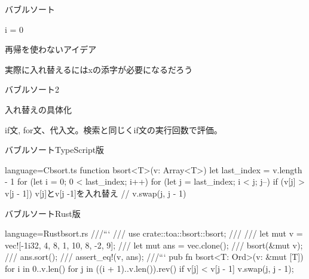 \documentclass{beamer}
\begin{document}
\begin{frame}[fragile]{バブルソート}{}
\begin{algorithm}[H]
\BlankLine
i = 0
\caption[page]{再帰を使わないアイデア}
\end{algorithm}

実際に入れ替えるにはxの添字が必要になるだろう
\end{frame}

\begin{frame}[fragile]{バブルソート2}{}

\begin{algorithm}[H]
\BlankLine
{}
\caption[page]{入れ替えの具体化}
\end{algorithm}
\vfill
if文, for文、代入文。検索と同じくif文の実行回数で評価。
\end{frame}

\begin{frame}[fragile]{バブルソートTypeScript版}{}
\begin{codeof}{language=C}{bsort.ts}
function bsort<T>(v: Array<T>) {
  let last_index = v.length - 1
  for (let i = 0; 0 < last_index; i++) {
    for (let j = last_index; i < j; j--) {
      if (v[j] > v[j - 1]) {
        v[j]とv[j -1]を入れ替え // v.swap(j, j - 1)
      }
    }
  }
}
\end{codeof}
\end{frame}

\begin{frame}[fragile]{バブルソートRust版}{}
\begin{codeof}{language=Rust}{bsort.rs}
///```
/// use crate::toa::bsort::bsort;
///
/// let mut v = vec![-1i32, 4, 8, 1, 10, 8, -2, 9];
/// let mut ans = vec.clone();
/// bsort(&mut v);
/// ans.sort();
/// assert_eq!(v, ans);
///```
pub fn bsort<T: Ord>(v: &mut [T]) {
    for i in 0..v.len() {
        for j in ((i + 1)..v.len()).rev() {
            if v[j] < v[j - 1] {
                v.swap(j, j - 1);
            }
        }
    }
}
\end{codeof}
\end{frame}
\end{document}
